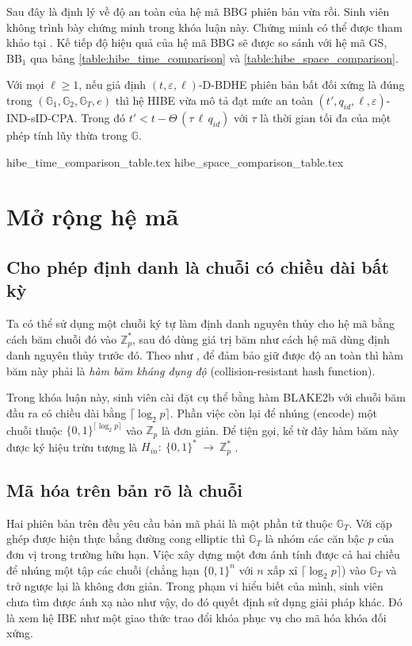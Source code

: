 \documentclass[class=report, crop=false]{standalone}
\begin{document}
		Sau đây là định lý về độ an toàn của hệ mã BBG phiên bản vừa rồi. Sinh viên không trình bày chứng minh trong khóa luận này. Chứng minh có thể được tham khảo tại \cite{DBLP:conf/eurocrypt/BonehBG05}. Kế tiếp độ hiệu quả của hệ mã BBG sẽ được so sánh với hệ mã GS, BB$_1$ qua bảng \ref{table:hibe_time_comparison} và \ref{table:hibe_space_comparison}.
		\begin{theorem}
			Với mọi $\ell \geq 1$, nếu giả định $(t, \varepsilon, \ell)$-D-BDHE phiên bản bất đối xứng là đúng trong $(\mathbb{G}_1, \mathbb{G}_2, \mathbb{G}_T, e)$ thì hệ HIBE vừa mô tả đạt mức an toàn $(t', q_{id}, \ell, \varepsilon)$-IND-sID-CPA. Trong đó $t' < t - \Theta\,(\tau\, \ell\, q_{id})$ với $\tau$ là thời gian tối đa của một phép tính lũy thừa trong $\mathbb{G}$.
		\end{theorem}
		\newpage
		{hibe_time_comparison_table.tex}
		{hibe_space_comparison_table.tex}
	\section{Mở rộng hệ mã}
		\subsection{Cho phép định danh là chuỗi có chiều dài bất kỳ}
			Ta có thể sử dụng một chuỗi ký tự làm định danh nguyên thủy cho hệ mã bằng cách băm chuỗi đó vào $\mathbb{Z}_p^*$, sau đó dùng giá trị băm như cách hệ mã dùng định danh nguyên thủy trước đó. Theo như \cite[mục 3.1]{DBLP:conf/eurocrypt/BonehBG05}, để đảm bảo giữ được độ an toàn thì hàm băm này phải là \textit{hàm băm kháng đụng độ} (collision-resistant hash function).

			Trong khóa luận này, sinh viên cài đặt cụ thể bằng hàm BLAKE2b \cite{DBLP:conf/acns/AumassonNWW13} với chuỗi băm đầu ra có chiều dài bằng $\lceil \log_2 p \rceil$. Phần việc còn lại để nhúng (encode) một chuỗi thuộc $\{0, 1\}^{\lceil \log_2 p \rceil}$ vào $\mathbb{Z}_p$ là đơn giản. Để tiện gọi, kể từ đây hàm băm này được ký hiệu trừu tượng là $H_{in}: 	\ \{0, 1 \}^* \ \rightarrow \ \mathbb{Z}_p^*$ .
		\subsection{Mã hóa trên bản rõ là chuỗi}
			Hai phiên bản trên đều yêu cầu bản mã phải là một phần tử thuộc $\mathbb{G}_T$. Với cặp ghép được hiện thực bằng đường cong elliptic thì $\mathbb{G}_T$ là nhóm các căn bậc $p$ của đơn vị trong trường hữu hạn. Việc xây dựng một đơn ánh tính được cả hai chiều để nhúng một tập các chuỗi (chẳng hạn $\{0, 1\}^n$ với $n$ xấp xỉ $\lceil \log_2 p \rceil$) vào $\mathbb{G}_T$ và trở ngược lại là không đơn giản. Trong phạm vi hiểu biết của mình, sinh viên chưa tìm được ánh xạ nào như vậy, do đó quyết định sử dụng giải pháp khác. Đó là xem hệ IBE như một giao thức trao đổi khóa phục vụ cho mã hóa khóa đối xứng.
\end{document}
